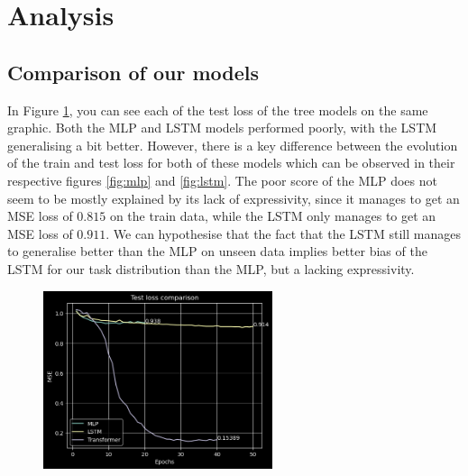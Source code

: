 \documentclass[11pt]{article}
\begin{document}
\section{Analysis}
\subsection{Comparison of our models}
In Figure \ref{fig:comparaison}, you can see each of the test loss of the tree models on the same graphic. Both the MLP and LSTM models performed poorly, with the LSTM generalising a bit better. However, there is a key difference between the evolution of the train and test loss for both of these models which can be observed in their respective figures \ref{fig:mlp} and \ref{fig:lstm}. The poor score of the MLP does not seem to be mostly explained by its lack of expressivity, since it manages to get an MSE loss of $0.815$ on the train data, while the LSTM only manages to get an MSE loss of $0.911$. We can hypothesise that the fact that the LSTM still manages to generalise better than the MLP on unseen data implies better bias of the LSTM for our task distribution than the MLP, but a lacking expressivity. \\

\begin{figure}[H]
    \caption{}
    \centering
    \includegraphics[width=0.6\textwidth]{images/comparaison.png}
    \label{fig:comparaison}
\end{figure}
\end{document}
